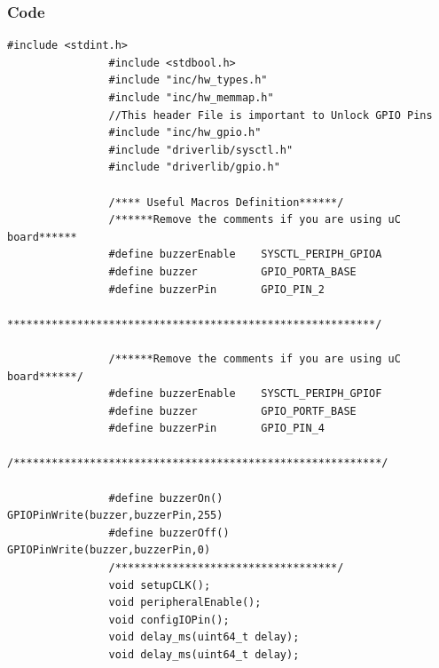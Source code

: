 \documentclass[a4paper,10pt,oneside]{article}
\begin{document}
			\subsubsection{\textbf{Code}}
			\begin{lstlisting}[style=CStyle]
				#include <stdint.h>
				#include <stdbool.h>
				#include "inc/hw_types.h"
				#include "inc/hw_memmap.h"
				//This header File is important to Unlock GPIO Pins
				#include "inc/hw_gpio.h"
				#include "driverlib/sysctl.h"
				#include "driverlib/gpio.h"
				
				/**** Useful Macros Definition******/
				/******Remove the comments if you are using uC board******
				#define buzzerEnable    SYSCTL_PERIPH_GPIOA
				#define buzzer          GPIO_PORTA_BASE
				#define buzzerPin       GPIO_PIN_2
				**********************************************************/
				
				/******Remove the comments if you are using uC board******/
				#define buzzerEnable    SYSCTL_PERIPH_GPIOF
				#define buzzer          GPIO_PORTF_BASE
				#define buzzerPin       GPIO_PIN_4
				/**********************************************************/
				
				#define buzzerOn()      GPIOPinWrite(buzzer,buzzerPin,255)
				#define buzzerOff()     GPIOPinWrite(buzzer,buzzerPin,0)
				/***********************************/
				void setupCLK();
				void peripheralEnable();
				void configIOPin();
				void delay_ms(uint64_t delay);
				void delay_ms(uint64_t delay);
				

\end{lstlisting}
\end{document}

